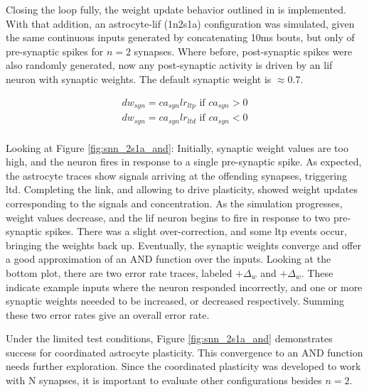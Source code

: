 Closing the loop fully, the weight update behavior outlined in
 is implemented. With that addition, an astrocyte-\gls{lif}
(1n2s1a) configuration was simulated, given the same continuous inputs generated
by concatenating 10ms bouts, but only of pre-synaptic spikes for $n=2$
synapses. Where before, post-synaptic spikes were also randomly generated, now
any post-synaptic activity is driven by an \gls{lif} neuron with synaptic
weights.  The default synaptic weight is $\approx 0.7$.

\begin{align}
  dw_{syn} = ca_{syn} lr_{ltp} \textrm{ if } ca_{syn} >
  0 \label{eq:astro_and_dw} \\
  dw_{syn} = ca_{syn} lr_{ltd} \textrm{ if } ca_{syn} < 0 \\
\end{align}



Looking at Figure \ref{fig:snn_2s1a_and}: Initially, synaptic weight values are
too high, and the neuron fires in response to a single pre-synaptic spike. As
expected, the astrocyte traces show \dser signals arriving at the offending
synapses, triggering \gls{ltd}. Completing the link, and allowing \ca to drive
plasticity, showed weight updates corresponding to the \dser signals and \ca
concentration. As the simulation progresses, weight values decrease, and the \gls{lif}
neuron begins to fire in response to two pre-synaptic spikes. There was a slight
over-correction, and some \gls{ltp} events occur, bringing the weights back
up. Eventually, the synaptic weights converge and offer a good approximation of
an AND function over the inputs. Looking at the bottom plot, there are two error
rate traces, labeled $+\Delta_w$ and $+\Delta_w$. These indicate example inputs
where the neuron responded incorrectly, and one or more synaptic weights neeeded
to be increased, or decreased respectively. Summing these two error rates give
an overall error rate.

Under the limited test conditions, Figure \ref{fig:snn_2s1a_and} demonstrates
success for coordinated astrocyte plasticity. This convergence to an AND
function needs further exploration. Since the coordinated plasticity was
developed to work with N synapses, it is important to evaluate other
configurations besides $n=2$.

